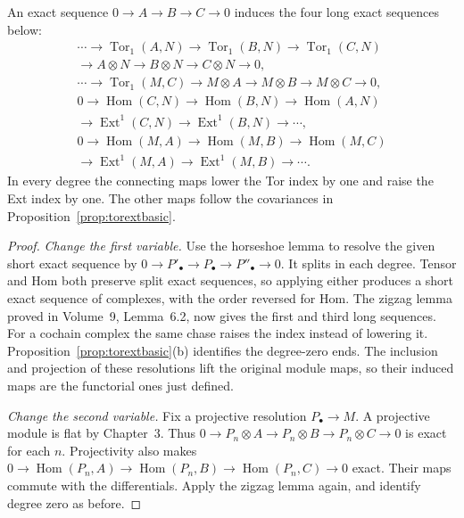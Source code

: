 \begin{theorem}\label{thm:les}
An exact sequence $0\to A\to B\to C\to0$ induces the four long exact sequences below:
\[
\begin{gathered}
\cdots\to\operatorname{Tor}_1(A,N)\to\operatorname{Tor}_1(B,N)
\to\operatorname{Tor}_1(C,N)\\
\to A\otimes N\to B\otimes N\to C\otimes N\to0,\\[2pt]
\cdots\to\operatorname{Tor}_1(M,C)
\to M\otimes A\to M\otimes B\to M\otimes C\to0,\\[2pt]
0\to\operatorname{Hom}(C,N)\to\operatorname{Hom}(B,N)
\to\operatorname{Hom}(A,N)\\
\to\operatorname{Ext}^1(C,N)\to\operatorname{Ext}^1(B,N)\to\cdots,\\[2pt]
0\to\operatorname{Hom}(M,A)\to\operatorname{Hom}(M,B)
\to\operatorname{Hom}(M,C)\\
\to\operatorname{Ext}^1(M,A)\to\operatorname{Ext}^1(M,B)\to\cdots.
\end{gathered}
\]
In every degree the connecting maps lower the Tor index by one and raise the Ext index by one. The other maps follow the covariances in Proposition~\ref{prop:torextbasic}.
\end{theorem}

\begin{proof}
\emph{Change the first variable.} Use the horseshoe lemma to resolve the given short exact sequence by
$0\to P'_\bullet\to P_\bullet\to P''_\bullet\to0$.
It splits in each degree. Tensor and Hom both preserve split exact sequences, so applying either produces a short exact sequence of complexes, with the order reversed for Hom. The zigzag lemma proved in Volume~9, Lemma~6.2, now gives the first and third long sequences. For a cochain complex the same chase raises the index instead of lowering it. Proposition~\ref{prop:torextbasic}(b) identifies the degree-zero ends. The inclusion and projection of these resolutions lift the original module maps, so their induced maps are the functorial ones just defined.

\emph{Change the second variable.} Fix a projective resolution $P_\bullet\to M$. A projective module is flat by Chapter~3. Thus
$0\to P_n\otimes A\to P_n\otimes B\to P_n\otimes C\to0$ is exact for each $n$.
Projectivity also makes
$0\to\operatorname{Hom}(P_n,A)\to\operatorname{Hom}(P_n,B)\to\operatorname{Hom}(P_n,C)\to0$ exact. Their maps commute with the differentials. Apply the zigzag lemma again, and identify degree zero as before.
\end{proof}

